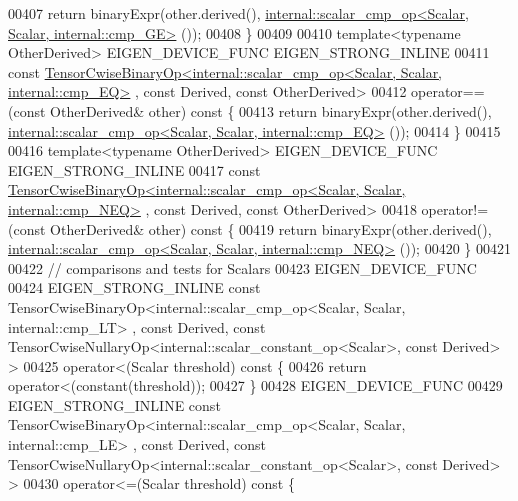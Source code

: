 \begin{DoxyCode}
00407       \textcolor{keywordflow}{return} binaryExpr(other.derived(), 
      \hyperlink{struct_eigen_1_1internal_1_1scalar__cmp__op}{internal::scalar\_cmp\_op<Scalar, Scalar, internal::cmp\_GE>}
      ());
00408     \}
00409 
00410     \textcolor{keyword}{template}<\textcolor{keyword}{typename} OtherDerived> EIGEN\_DEVICE\_FUNC EIGEN\_STRONG\_INLINE
00411     \textcolor{keyword}{const} 
      \hyperlink{class_eigen_1_1_tensor_cwise_binary_op}{TensorCwiseBinaryOp<internal::scalar\_cmp\_op<Scalar, Scalar, internal::cmp\_EQ>}
      , \textcolor{keyword}{const} Derived, \textcolor{keyword}{const} OtherDerived>
00412     operator==(\textcolor{keyword}{const} OtherDerived& other)\textcolor{keyword}{ const }\{
00413       \textcolor{keywordflow}{return} binaryExpr(other.derived(), 
      \hyperlink{struct_eigen_1_1internal_1_1scalar__cmp__op}{internal::scalar\_cmp\_op<Scalar, Scalar, internal::cmp\_EQ>}
      ());
00414     \}
00415 
00416     \textcolor{keyword}{template}<\textcolor{keyword}{typename} OtherDerived> EIGEN\_DEVICE\_FUNC EIGEN\_STRONG\_INLINE
00417     \textcolor{keyword}{const} 
      \hyperlink{class_eigen_1_1_tensor_cwise_binary_op}{TensorCwiseBinaryOp<internal::scalar\_cmp\_op<Scalar, Scalar, internal::cmp\_NEQ>}
      , \textcolor{keyword}{const} Derived, \textcolor{keyword}{const} OtherDerived>
00418     operator!=(\textcolor{keyword}{const} OtherDerived& other)\textcolor{keyword}{ const }\{
00419       \textcolor{keywordflow}{return} binaryExpr(other.derived(), 
      \hyperlink{struct_eigen_1_1internal_1_1scalar__cmp__op}{internal::scalar\_cmp\_op<Scalar, Scalar, internal::cmp\_NEQ>}
      ());
00420     \}
00421 
00422     \textcolor{comment}{// comparisons and tests for Scalars}
00423     EIGEN\_DEVICE\_FUNC
00424     EIGEN\_STRONG\_INLINE \textcolor{keyword}{const} TensorCwiseBinaryOp<internal::scalar\_cmp\_op<Scalar, Scalar, internal::cmp\_LT>
      , \textcolor{keyword}{const} Derived, \textcolor{keyword}{const} TensorCwiseNullaryOp<internal::scalar\_constant\_op<Scalar>, \textcolor{keyword}{const} Derived> >
00425     operator<(Scalar threshold)\textcolor{keyword}{ const }\{
00426       \textcolor{keywordflow}{return} operator<(constant(threshold));
00427     \}
00428     EIGEN\_DEVICE\_FUNC
00429     EIGEN\_STRONG\_INLINE \textcolor{keyword}{const} TensorCwiseBinaryOp<internal::scalar\_cmp\_op<Scalar, Scalar, internal::cmp\_LE>
      , \textcolor{keyword}{const} Derived, \textcolor{keyword}{const} TensorCwiseNullaryOp<internal::scalar\_constant\_op<Scalar>, \textcolor{keyword}{const} Derived> >
00430     operator<=(Scalar threshold)\textcolor{keyword}{ const }\{

\end{DoxyCode}
